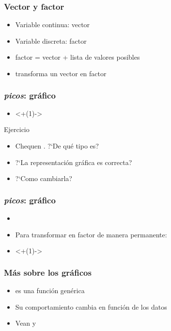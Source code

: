 \documentclass[mathserif]{beamer}
\begin{document}
\begin{frame}[plain,label=d24]%
\frametitle{Vector y factor}
\begin{itemize}
   \item Variable continua: vector
   \item Variable discreta: factor
   \item factor = vector + lista de valores posibles
   \item {} transforma un vector en factor
\end{itemize}
\end{frame}%

\begin{frame}[plain,label=d25]%
\frametitle{\emph{picos}: gr\'afico}
\begin{itemize}
   \item<+(1)-> 
\end{itemize}
\begin{exampleblock}{Ejercicio}
\begin{itemize}[<+->]
   \item Chequen . ?`De qu\'e tipo es?
   \item ?`La representaci\'on gr\'afica es correcta?
   \item ?`Como cambiarla?
\end{itemize}
\end{exampleblock}
\end{frame}%

\begin{frame}[plain,label=d26]%
\frametitle{\emph{picos}: gr\'afico}
\small
\begin{itemize}[<+->]
   \item {}
   \item Para transformar en factor de manera permanente:
   \item<+(1)-> 
\end{itemize}
\end{frame}%

\begin{frame}[plain,label=d27]%
\frametitle{M\'as sobre los gr\'aficos}
\begin{itemize}
   \item {} es una funci\'on gen\'erica
   \item Su comportamiento cambia en funci\'on de los datos
   \item Vean  y 
\end{itemize}
\end{frame}%
\end{document}
